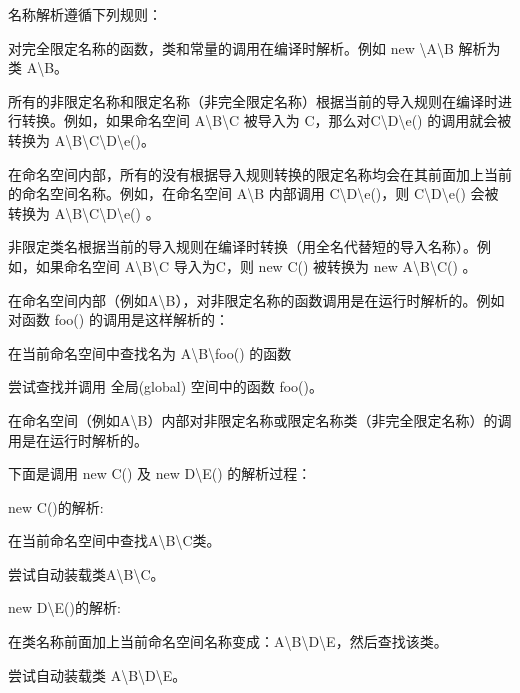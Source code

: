 名称解析遵循下列规则：

\begin{compactenum}
\item 对完全限定名称的函数，类和常量的调用在编译时解析。例如 new \textbackslash A\textbackslash B 解析为类 A\textbackslash B。
\item 所有的非限定名称和限定名称（非完全限定名称）根据当前的导入规则在编译时进行转换。例如，如果命名空间 A\textbackslash B\textbackslash C 被导入为 C，那么对C\textbackslash D\textbackslash e() 的调用就会被转换为 A\textbackslash B\textbackslash C\textbackslash D\textbackslash e()。
\item 在命名空间内部，所有的没有根据导入规则转换的限定名称均会在其前面加上当前的命名空间名称。例如，在命名空间 A\textbackslash B 内部调用 C\textbackslash D\textbackslash e()，则 C\textbackslash D\textbackslash e() 会被转换为 A\textbackslash B\textbackslash C\textbackslash D\textbackslash e() 。
\item 非限定类名根据当前的导入规则在编译时转换（用全名代替短的导入名称）。例如，如果命名空间 A\textbackslash B\textbackslash C 导入为C，则 new C() 被转换为 new A\textbackslash B\textbackslash C() 。
\item 在命名空间内部（例如A\textbackslash B），对非限定名称的函数调用是在运行时解析的。例如对函数 foo() 的调用是这样解析的：
	\begin{compactenum}
	\item 在当前命名空间中查找名为 A\textbackslash B\textbackslash foo() 的函数
	\item 尝试查找并调用 全局(global) 空间中的函数 foo()。
	\end{compactenum}

\item 在命名空间（例如A\textbackslash B）内部对非限定名称或限定名称类（非完全限定名称）的调用是在运行时解析的。

下面是调用 new C() 及 new D\textbackslash E() 的解析过程：

	\begin{compactitem}
	\item new C()的解析:
		\begin{compactenum}
		\item 在当前命名空间中查找A\textbackslash B\textbackslash C类。
		\item 尝试自动装载类A\textbackslash B\textbackslash C。
		\end{compactenum}
	\item new D\textbackslash E()的解析:
		\begin{compactenum}
		\item 在类名称前面加上当前命名空间名称变成：A\textbackslash B\textbackslash D\textbackslash E，然后查找该类。
		\item 尝试自动装载类 A\textbackslash B\textbackslash D\textbackslash E。
		\end{compactenum}
\end{compactitem}

\end{compactenum}

